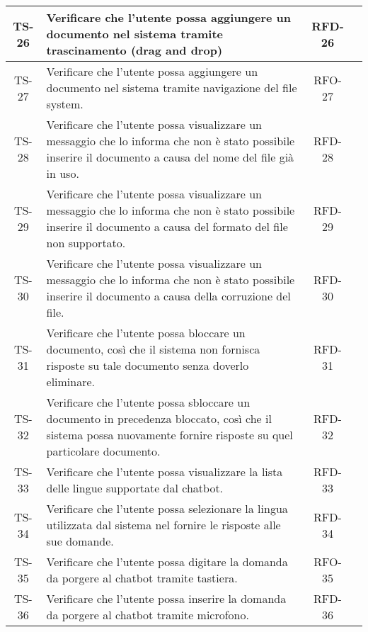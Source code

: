 \begin{xltabular}{\textwidth}{| c | X | c | c |}
    \hline
    TS-26 & Verificare che l’utente possa aggiungere un documento nel sistema tramite trascinamento (drag and drop) & RFD-26 & \textcolor{xmarkcolor}{} \\
    \hline
    TS-27 & Verificare che l’utente possa aggiungere un documento nel sistema tramite navigazione del file system. & RFO-27 & \textcolor{xmarkcolor}{} \\
    \hline
    TS-28 & Verificare che l'utente possa visualizzare un messaggio che lo informa che non è stato possibile inserire il documento a causa del nome del file già in uso. & RFD-28 & \textcolor{xmarkcolor}{} \\
    \hline
    TS-29 & Verificare che l’utente possa visualizzare un messaggio che lo informa che non è stato possibile inserire il documento a causa del formato del file non supportato. & RFD-29 & \textcolor{xmarkcolor}{} \\
    \hline
    TS-30 & Verificare che l’utente possa visualizzare un messaggio che lo informa che non è stato possibile inserire il documento a causa della corruzione del file. & RFD-30 & \textcolor{xmarkcolor}{} \\
    \hline
    TS-31 & Verificare che l'utente possa bloccare un documento, così che il sistema non fornisca risposte su tale documento senza doverlo eliminare. & RFD-31 & \textcolor{xmarkcolor}{} \\
    \hline
    TS-32 & Verificare che l'utente possa sbloccare un documento in precedenza bloccato, così che il sistema possa nuovamente fornire risposte su quel particolare documento. & RFD-32 & \textcolor{xmarkcolor}{} \\
    \hline
    TS-33 & Verificare che l’utente possa visualizzare la lista delle lingue supportate dal chatbot. & RFD-33 & \textcolor{xmarkcolor}{} \\
    \hline
    TS-34 &  Verificare che l'utente possa selezionare la lingua utilizzata dal sistema nel fornire le risposte alle sue domande. & RFD-34 & \textcolor{xmarkcolor}{} \\
    \hline
    TS-35 & Verificare che l'utente possa digitare la domanda da porgere al chatbot tramite tastiera. & RFO-35 & \textcolor{xmarkcolor}{} \\
    \hline
    TS-36 & Verificare che l’utente possa inserire la domanda da porgere al chatbot tramite microfono. & RFD-36 & \textcolor{xmarkcolor}{} \\
    \hline

\end{xltabular}
